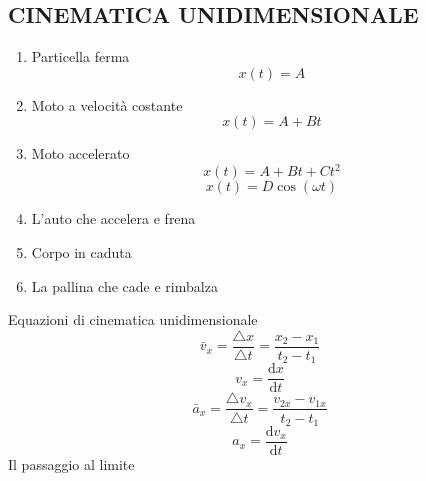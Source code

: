 \documentclass{article}
\begin{document}
\begin{multicols}{2}
		\subsection{CINEMATICA UNIDIMENSIONALE}
			\begin{enumerate}
				\item Particella ferma
					\begin{equation} x(t) = A \end{equation}
				\item Moto a velocità costante
					\begin{equation} x(t) = A + B t \end{equation}
				\item Moto accelerato
					\begin{equation} x(t) = A + B t + C t^2 \end{equation}
					\begin{equation} x(t) = D \cos ( \omega t ) \end{equation}
				\item L'auto che accelera e frena
				\item Corpo in caduta
				\item La pallina che cade e rimbalza
			\end{enumerate}
			Equazioni di cinematica unidimensionale
			\begin{equation} \bar v_x = \frac{ \triangle x }{ \triangle t } = \frac{ x_2 - x_1 }{ t_2 - t_1 } \end{equation}
			\begin{equation} v_x = \frac{ \mathrm d x }{ \mathrm d t } \end{equation}
			\begin{equation} \bar a_x = \frac{ \triangle v_x }{ \triangle t } = \frac{ v_{2x} - v_{1x} }{ t_2 - t_1 } \end{equation}
			\begin{equation} a_x = \frac{ \mathrm d v_x }{ \mathrm d t} \end{equation}
			Il passaggio al limite

\end{multicols}
\end{document}
